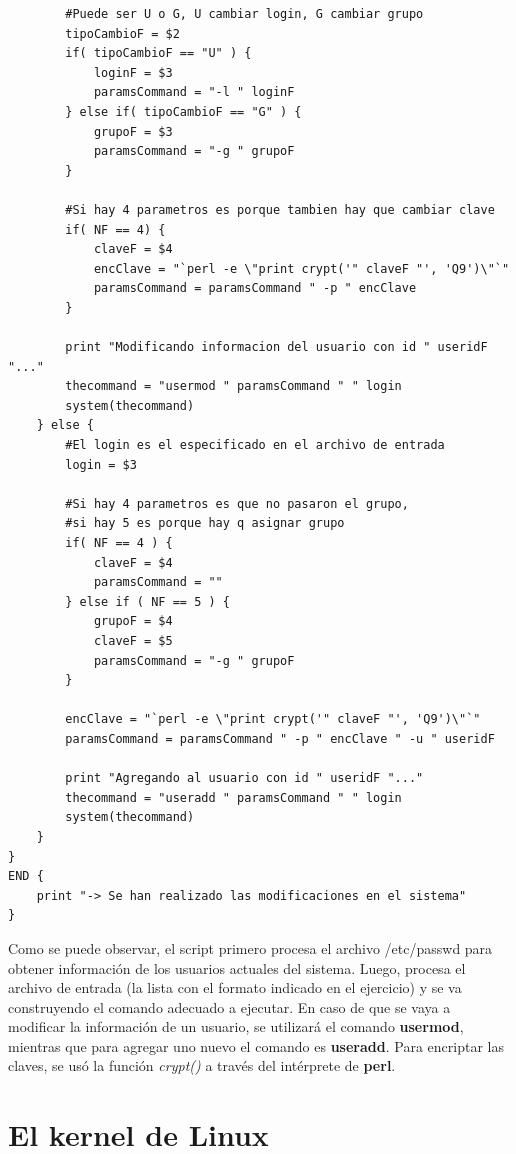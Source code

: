 \documentclass[a4paper,11pt] {article}
\begin{document}
\begin{enumerate}
\begin{verbatim}
        #Puede ser U o G, U cambiar login, G cambiar grupo
        tipoCambioF = $2
        if( tipoCambioF == "U" ) {
            loginF = $3
            paramsCommand = "-l " loginF
        } else if( tipoCambioF == "G" ) {
            grupoF = $3
            paramsCommand = "-g " grupoF
        }

        #Si hay 4 parametros es porque tambien hay que cambiar clave
        if( NF == 4) { 
            claveF = $4
            encClave = "`perl -e \"print crypt('" claveF "', 'Q9')\"`"
            paramsCommand = paramsCommand " -p " encClave
        }

        print "Modificando informacion del usuario con id " useridF "..."
        thecommand = "usermod " paramsCommand " " login
        system(thecommand)
    } else {
        #El login es el especificado en el archivo de entrada
        login = $3

        #Si hay 4 parametros es que no pasaron el grupo,
        #si hay 5 es porque hay q asignar grupo
        if( NF == 4 ) { 
            claveF = $4
            paramsCommand = ""
        } else if ( NF == 5 ) {
            grupoF = $4
            claveF = $5
            paramsCommand = "-g " grupoF
        }

        encClave = "`perl -e \"print crypt('" claveF "', 'Q9')\"`"
        paramsCommand = paramsCommand " -p " encClave " -u " useridF

        print "Agregando al usuario con id " useridF "..."
        thecommand = "useradd " paramsCommand " " login
        system(thecommand)
    }
}
END {
    print "-> Se han realizado las modificaciones en el sistema"
}
	\end{verbatim}

	Como se puede observar, el script primero procesa el archivo /etc/passwd para obtener información de los usuarios actuales del sistema. Luego, procesa el archivo de entrada (la lista con el formato indicado en el ejercicio) y se va construyendo el comando adecuado a ejecutar. En caso de que se vaya a modificar la información de un usuario, se utilizará el comando \textbf{usermod}, mientras que para agregar uno nuevo el comando es \textbf{useradd}. Para encriptar las claves, se usó la función \textit{crypt()} a través del intérprete de \textbf{perl}.

\end{enumerate}

\section*{El kernel de Linux}
\end{document}
